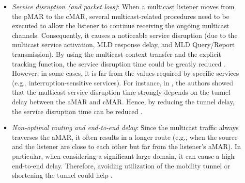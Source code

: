 \begin{itemize}
\item \textit{Service disruption (and packet loss)}: When a multicast listener moves from the pMAR to the cMAR, several multicast-related procedures need to be executed to allow the listener to continue receiving the ongoing multicast channels. Consequently, it causes a noticeable service disruption (due to the multicast service activation, MLD response delay, and MLD Query/Report transmission). By using the multicast context transfer and the explicit tracking function, the service disruption time could be greatly reduced \cite{Thinh_WCNC_Multicast}. However, in some cases, it is far from the values required by specific services (e.g., interruption-sensitive services). For instance, in \cite{Thinh_ICNS, multicast_DMM_Sergio_PIMRC}, the authors showed that the multicast service disruption time strongly depends on the tunnel delay between the aMAR and cMAR. Hence, by reducing the tunnel delay, the service disruption time can be reduced \cite{Thinh_ICC}.
\item \textit{Non-optimal routing and end-to-end delay}: Since the multicast traffic always traverses the aMAR, it often results in a longer route (e.g., when the source and the listener are close to each other but far from the listener's aMAR). In particular, when considering a significant large domain, it can cause a high end-to-end delay. Therefore, avoiding utilization of the mobility tunnel or shortening the tunnel could help \cite{Thinh_ICC}.  

\end{itemize}
